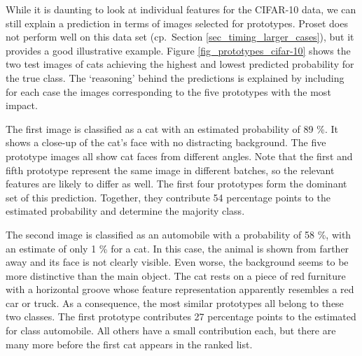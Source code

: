 %
While it is daunting to look at individual features for the CIFAR-10 data, we can still explain a prediction in terms of images selected for prototypes.
Proset does not perform well on this data set (cp.\ Section \ref{sec_timing_larger_cases}), but it provides a good illustrative example.
Figure \ref{fig_prototypes_cifar-10} shows the two test images of cats achieving the highest and lowest predicted probability for the true class.
The `reasoning' behind the predictions is explained by including for each case the images corresponding to the five prototypes with the most impact.\par
%
The first image is classified as a cat with an estimated probability of 89 \%.
It shows a close-up of the cat's face with no distracting background.
The five prototype images all show cat faces from different angles.
Note that the first and fifth prototype represent the same image in different batches, so the relevant features are likely to differ as well.
The first four prototypes form the dominant set of this prediction.
Together, they contribute 54 percentage points to the estimated probability and determine the majority class.\par
%
The second image is classified as an automobile with a probability of 58 \%, with an estimate of only 1 \% for a cat.
In this case, the animal is shown from farther away and its face is not clearly visible.
Even worse, the background seems to be more distinctive than the main object.
The cat rests on a piece of red furniture with a horizontal groove whose feature representation apparently resembles a red car or truck.
As a consequence, the most similar prototypes all belong to these two classes.
The first prototype contributes 27 percentage points to the estimated for class automobile.
All others have a small contribution each, but there are many more before the first cat appears in the ranked list.
%
